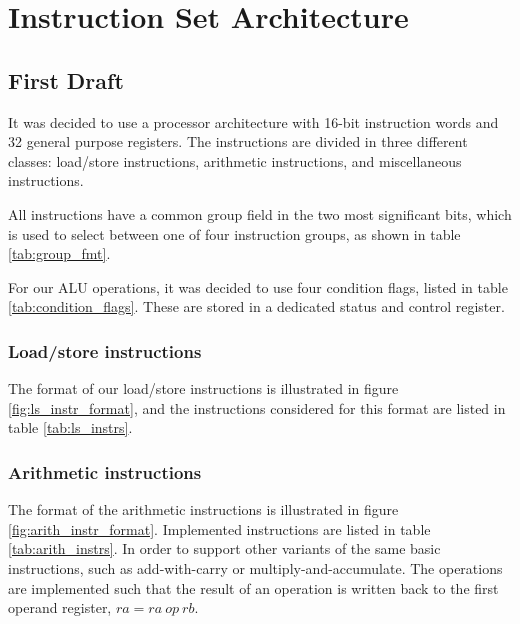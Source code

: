 \section{Instruction Set Architecture}

\subsection{First Draft}
It was decided to use a processor architecture with 16-bit instruction words
and 32 general purpose registers. The instructions are divided in three
different classes: load/store instructions, arithmetic instructions, and
miscellaneous instructions.

All instructions have a common group field in the two most significant bits,
which is used to select between one of four instruction groups, as shown in
table \ref{tab:group_fmt}.

For our ALU operations, it was decided to use four condition flags, listed in
table \ref{tab:condition_flags}. These are stored in a dedicated status and
control register.




\subsubsection{Load/store instructions}
The format of our load/store instructions is illustrated in figure
\ref{fig:ls_instr_format}, and the instructions considered for this format
are listed in table \ref{tab:ls_instrs}.




\subsubsection{Arithmetic instructions}
The format of the arithmetic instructions is illustrated in figure
\ref{fig:arith_instr_format}.
Implemented instructions are listed in table \ref{tab:arith_instrs}. In order
to support other variants of the same basic instructions, such as add-with-carry
or multiply-and-accumulate. The operations are implemented such that the result
of an operation is written back to the first operand register, $ra = ra~op~rb$.




